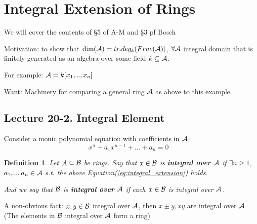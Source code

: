 \documentclass[11pt]{article}
\newtheorem{dfn}[thm]{Definition}
\newcommand{\cala}{{\cal A}}
\newcommand{\calb}{{\cal B}}
\begin{document}
\section{Integral Extension of Rings}
We will cover the contents of \S 5 of A-M and \S 3 pf Bosch

Motivation: to show that $\text{dim}(\cala)=tr.deg_k(Frac(\cala))$, $\forall\cala$ integral domain that is finitely generated as an algebra over some field $k\subseteq\cala$.

For example: $\cala=k[x_1,..,x_n]$

\underline{Want}: Machinery for comparing a general ring $\cala$ as above to this example.

\subsection{Lecture 20-2. Integral Element}

Consider a monic polynomial equation with coefficients in $\cala$:
\begin{equation}\label{eq:integral_extension}\tag{*}
x^n+a_1 x^{n-1}+...+a_n=0
\end{equation}
\begin{dfn}
Let $\cala\subseteq \calb$ be rings. Say that $x\in\calb$ is \textbf{integral over $\cala$} if $\exists n\geq 1$, $a_1,..,a_{n}\in\cala$ s.t. the above Equation(\ref{eq:integral_extension}) holds.

And we say that $\calb$ is \textbf{integral over $\cala$} if each $x\in\calb$ is integral over $\cala$.
\end{dfn}

A non-obvious fact: $x,y\in \calb$ integral over $\cala$, then $x\pm y, xy$ are integral over $\cala$ (The elements in $\calb$ integral over $\cala$ form a ring)
\end{document}
